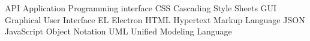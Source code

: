 
   {API}      {Application Programming interface}
    {CSS}       {Cascading Style Sheets}
    {GUI}       {Graphical User Interface}
     {EL}        {Electron}
   {HTML}      {Hypertext Markup Language}
   {JSON}      {JavaScript Object Notation}
   {UML}      {Unified Modeling Language}